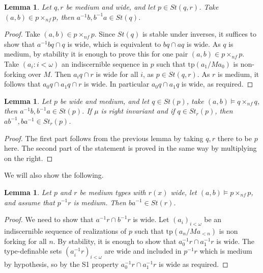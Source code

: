 \documentclass[12pt]{article}
\newtheorem{lemme}[thm]{Lemma}
\theoremstyle{definition}
\theoremstyle{mystyle}
\theoremstyle{remark}
\newcommand{\tp}{\mathrm{tp}}
\newcommand{\nf}{\times_{nf}}
\begin{document}
\begin{lemme}\label{lem0}
Let $q,r$ be medium and wide, and let $p\in St(q,r)$. Take $(a,b)\in p\nf p$, then $a^{-1}b, b^{-1}a \in St(q)$.
\end{lemme}
\begin{proof}
Take $(a,b)\in p\nf p$. Since $St(q)$ is stable under inverses, it suffices to show that $a^{-1}b q\cap q$ is wide, which is equivalent to $b q \cap a q$ is wide. As $q$ is medium, by stability it is enough to prove this for one pair $(a,b)\in p\nf p$. Take $(a_i:i<\omega)$ an indiscernible sequence in $p$ such that $\tp(a_1/Ma_0)$ is non-forking over $M$. Then $a_i q \cap r$ is wide for all $i$, as $p\in St(q,r)$. As $r$ is medium, it follows that $a_0 q \cap a_1 q \cap r$ is wide. In particular $a_0 q \cap a_1 q$ is wide, as required.
\end{proof}

\begin{lemme}\label{lem1}
Let $p$ be wide and medium, and let $q\in St(p)$, take $(a,b)\models q\nf q$, then $a^{-1}b, b^{-1}a \in St(p)$. If $\mu$ is right invariant and if $q\in St_r(p)$, then $ab^{-1}, ba^{-1}\in St_r(p)$.
\end{lemme}
\begin{proof}
The first part follows from the previous lemma by taking $q,r$ there to be $p$ here. The second part of the statement is proved in the same way by multiplying on the right.
\end{proof}


We will also show the following.

\begin{lemme}\label{repeatedClaim}
Let $p$ and $r$ be medium types with $r(x)$ wide, let
$(a,b)\models p \times_{nf} p$, and assume that $p^{-1}r$ is
medium. Then $ba^{-1}\in St(r)$.
\end{lemme}

\begin{proof}
We need to show that $a^{-1} r \cap b^{-1} r$ is wide. Let
$(a_i)_{i<\omega}$ be an indiscernible sequence of realizations of
$p$ such that $\tp(a_n/Ma_{<n})$ is non forking for all $n$. By
stability, it is enough to show that $a_0^{-1} r \cap a_1^{-1} r$
is wide. The type-definable sets $(a_i^{-1} r)_{i<\omega}$ are
wide and included in $p^{-1}r$ which is medium by hypothesis, so
by the S1 property $a_0^{-1} r\cap a_1^{-1} r$ is wide as
required.
\end{proof}
\end{document}
